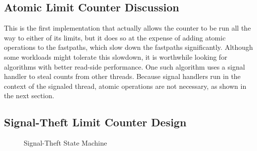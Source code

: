 \subsection{Atomic Limit Counter Discussion}

This is the first implementation that actually allows the counter to
be run all the way to either of its limits, but it does so at the
expense of adding atomic operations to the fastpaths, which slow down
the fastpaths significantly.
Although some workloads might tolerate this slowdown, it is worthwhile
looking for algorithms with better read-side performance.
One such algorithm uses a signal handler to steal counts from other
threads.
Because signal handlers run in the context of the signaled thread,
atomic operations are not necessary, as shown in the next section.

\subsection{Signal-Theft Limit Counter Design}

\begin{figure}[tb]
\begin{center}
\end{center}
\caption{Signal-Theft State Machine}
\label{fig:count:Signal-Theft State Machine}
\end{figure}

